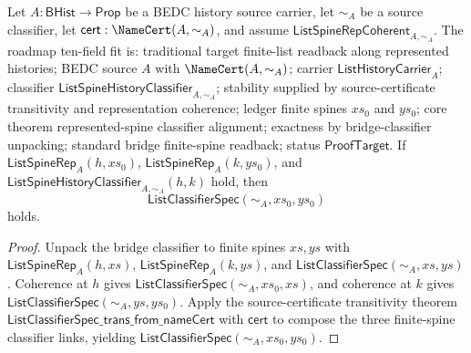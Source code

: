 \begin{theorem}
\label{thm:list-represented-spine-classifier-alignment}
Let $A:\mathsf{BHist}\to\mathsf{Prop}$ be a BEDC history source carrier, let
$\sim_A$ be a source classifier, let $\mathsf{cert}:\NameCert(A,\sim_A)$, and
assume $\mathsf{ListSpineRepCoherent}_{A,\sim_A}$. The roadmap ten-field fit is:
traditional target finite-list readback along represented histories; BEDC
source $A$ with $\NameCert(A,\sim_A)$; carrier $\mathsf{ListHistoryCarrier}_A$;
classifier $\mathsf{ListSpineHistoryClassifier}_{A,\sim_A}$; stability supplied
by source-certificate transitivity and representation coherence; ledger finite
spines $xs_0$ and $ys_0$; core theorem represented-spine classifier alignment;
exactness by bridge-classifier unpacking; standard bridge finite-spine
readback; status $\mathsf{ProofTarget}$. If
$\mathsf{ListSpineRep}_A(h,xs_0)$, $\mathsf{ListSpineRep}_A(k,ys_0)$, and
$\mathsf{ListSpineHistoryClassifier}_{A,\sim_A}(h,k)$ hold, then
$$
\mathsf{ListClassifierSpec}(\sim_A,xs_0,ys_0)
$$
holds.
\end{theorem}
\begin{proof}
Unpack the bridge classifier to finite spines $xs,ys$ with
$\mathsf{ListSpineRep}_A(h,xs)$, $\mathsf{ListSpineRep}_A(k,ys)$, and
$\mathsf{ListClassifierSpec}(\sim_A,xs,ys)$. Coherence at $h$ gives
$\mathsf{ListClassifierSpec}(\sim_A,xs_0,xs)$, and coherence at $k$ gives
$\mathsf{ListClassifierSpec}(\sim_A,ys,ys_0)$. Apply the source-certificate
transitivity theorem $\mathsf{ListClassifierSpec\_trans\_from\_nameCert}$ with
$\mathsf{cert}$ to compose the three finite-spine classifier links, yielding
$\mathsf{ListClassifierSpec}(\sim_A,xs_0,ys_0)$.
\end{proof}


